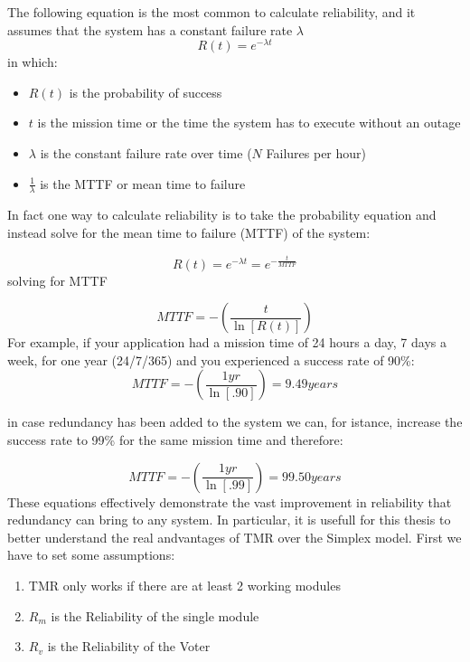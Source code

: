 \documentclass[./dissertation.tex]{subfiles}
\begin{document}
The following equation is the most common to calculate reliability, and it assumes that the system has a constant failure rate $\lambda$
\begin{equation}
    R(t) = e^{-\lambda t}
\end{equation}
in which:
\begin{itemize}
    \item $R(t)$ is the probability of success
    \item $t$ is the mission time or the time the system has to execute without an outage
    \item $\lambda$ is the constant failure rate over time ($N$ Failures per hour)
    \item $\frac{1}{\lambda}$ is the MTTF or mean time to failure
\end{itemize}

In fact one way  to calculate reliability is to take the probability equation and instead solve for the mean time to failure (MTTF) of the
system:

\begin{equation}
    R(t) = e^{-\lambda t } = e^{-\frac{t}{MTTF}}
\end{equation}
solving for MTTF

\begin{equation}
    MTTF = -\left( \frac{t}{\ln{[R(t)]}} \right)
\end{equation}
For example, if your application had a mission time of 24 hours a day, 7 days a week, for one year (24/7/365) and you experienced a
success rate of 90\%:
\begin{equation}
    MTTF = -\left( \frac{1yr}{\ln[.90]} \right) = 9.49 years
\end{equation}

in case redundancy has been added to the system we can, for istance, increase the success rate to 99\% for the same mission time and therefore:

\begin{equation}
    MTTF = -\left( \frac{1yr}{\ln[.99]} \right) = 99.50 years
\end{equation}
These equations effectively demonstrate the vast improvement in reliability that redundancy can bring to any system.
\newpage
In particular, it is usefull for this thesis to better understand the real andvantages of TMR over the Simplex model. First we have to set some assumptions:
\begin{enumerate}
    \item TMR only works if there are at least 2 working modules
    \item $R_m$ is the Reliability of the single module
    \item $R_v$ is the Reliability of the Voter
\end{enumerate}
\end{document}
